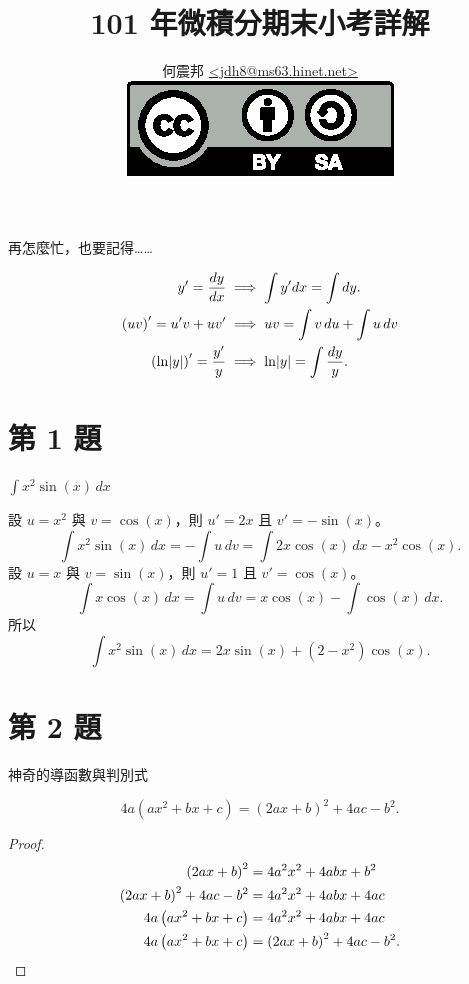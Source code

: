 \documentclass{beamer}
\title[期末小考]{101 年微積分期末小考詳解}
\author[何震邦]{何震邦 \href{mailto:jdh8@ms63.hinet.net}{\textless jdh8@ms63.hinet.net\textgreater}\\
    \href{http://creativecommons.org/licenses/by-sa/3.0/tw/deed.zh\textunderscore TW}{\includegraphics{by-sa.eps}}}
\newcommand{\Left} {\mathopen{}\mathclose\bgroup\left}
\newcommand{\Right}{\aftergroup\egroup\right}
\theoremstyle{remark}
\begin{document}
\begin{CJK}{UTF8}{bsmi}
\maketitle

\begin{frame}{再怎麼忙，也要記得\dots\dots}
  \begin{theorem}
    \begin{align*}
      y' = \frac{dy}{dx} &\implies \int y'dx = \int dy.\\
      \left( uv \right)' = u'v + uv' &\implies uv = \int v\,du + \int u\,dv\\
      \left( \ln \Left| y \Right| \right)' = \frac{y'}{y} &\implies \ln \Left| y \Right| = \int \frac{dy}{y}.
    \end{align*}
  \end{theorem}
\end{frame}

\section{第 1 題}
\begin{frame}{$\displaystyle \int x^2 \sin(x)\,dx$}
  \begin{solution}
    設 $u = x^2$ 與 $v = \cos(x)$，則 $u' = 2x$ 且 $v' = -\sin(x)$。
    \[\int x^2 \sin(x)\,dx = -\int u\,dv = \int 2x \cos(x)\,dx - x^2 \cos(x).\]
    設 $u = x$ 與 $v = \sin(x)$，則 $u' = 1$ 且 $v' = \cos(x)$。
    \[\int x \cos(x)\,dx = \int u\,dv = x \cos(x) - \int \cos(x)\,dx.\]
    所以
    \[\int x^2 \sin(x)\,dx = 2x \sin(x) + \left( 2 - x^2 \right) \cos(x).\]
  \end{solution}
\end{frame}

\section{第 2 題}
\begin{frame}{神奇的導函數與判別式}
  \begin{theorem}
    \[4a \left( ax^2 + bx + c \right) = \left( 2ax + b \right)^2 + 4ac - b^2.\]
    \begin{proof}
      \begin{align*}
	\left( 2ax + b \right)^2 &= 4a^2 x^2 + 4abx + b^2\\
	\left( 2ax + b \right)^2 + 4ac - b^2 &= 4a^2 x^2 + 4abx + 4ac\\
	4a \left( ax^2 + bx + c \right) &= 4a^2 x^2 + 4abx + 4ac\\
	4a \left( ax^2 + bx + c \right) &= \left( 2ax + b \right)^2 + 4ac - b^2.\qedhere
      \end{align*}
    \end{proof}
  \end{theorem}
\end{frame}


\end{CJK}
\end{document}
